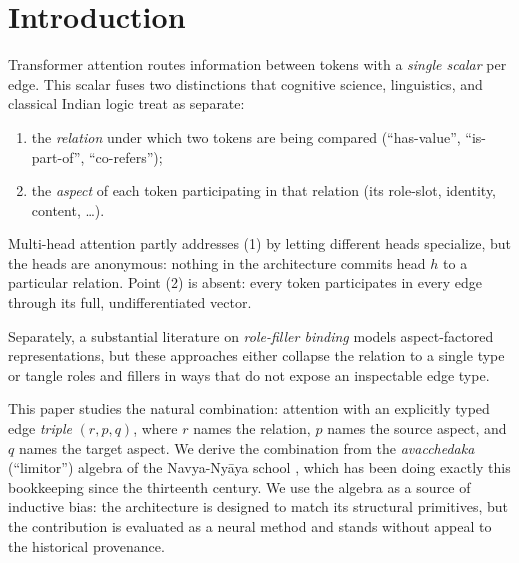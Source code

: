 \documentclass{article}
\begin{document}
\section{Introduction}

Transformer attention \citep{vaswani2017attention} routes information
between tokens with a \emph{single scalar} per edge. This scalar fuses
two distinctions that cognitive science, linguistics, and classical
Indian logic treat as separate:
\begin{enumerate}
    \item the \emph{relation} under which two tokens are being compared
      (``has-value'', ``is-part-of'', ``co-refers'');
    \item the \emph{aspect} of each token participating in that relation
      (its role-slot, identity, content, \ldots).
\end{enumerate}
Multi-head attention \citep{vaswani2017attention} partly addresses (1)
by letting different heads specialize, but the heads are anonymous:
nothing in the architecture commits head $h$ to a particular relation.
Point (2) is absent: every token participates in every edge through
its full, undifferentiated vector.

Separately, a substantial literature on \emph{role-filler binding}
\citep{smolensky1990tensor, plate1995holographic, schlag2019enhancing,
sabour2017dynamic, hinton2021glom} models aspect-factored
representations, but these approaches either collapse the relation to a
single type or tangle roles and fillers in ways that do not expose an
inspectable edge type.

This paper studies the natural combination: attention with an
explicitly typed edge \emph{triple} $(r, p, q)$, where $r$ names the
relation, $p$ names the source aspect, and $q$ names the target aspect.
We derive the combination from the \emph{avacchedaka} (``limitor'')
algebra of the Navya-Ny\=aya school \citep{matilal1968navya,
ganeri2011lost, wada2007navya}, which has been doing exactly this
bookkeeping since the thirteenth century. We use the algebra as a
source of inductive bias: the architecture is designed to match its
structural primitives, but the contribution is evaluated as a neural
method and stands without appeal to the historical provenance.
\end{document}
